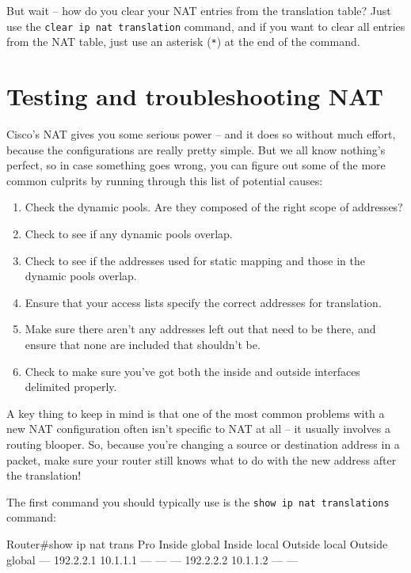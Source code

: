 But wait -- how do you clear your NAT entries from the translation table?
Just use the \texttt{clear\ ip\ nat\ translation} command, and if you
want to clear all entries from the NAT table, just use an asterisk
(\texttt{*}) at the end of the command.



\section{Testing and troubleshooting NAT}

Cisco's NAT gives you some serious power -- and it does so without much
effort, because the configurations are really pretty simple. But we all
know nothing's perfect, so in case something goes wrong, you can figure
out some of the more common culprits by running through this list of
potential causes:

\begin{enumerate}
\item
  Check the dynamic pools. Are they composed of the right scope of
  addresses?
\item
  Check to see if any dynamic pools overlap.
\item
  Check to see if the addresses used for static mapping and those in the
  dynamic pools overlap.
\item
  Ensure that your
  access lists specify the correct addresses for translation.
\item
  Make sure there aren't any addresses left out that need to be there,
  and ensure that none are included that shouldn't be.
\item
  Check to make sure you've got both the inside and outside interfaces
  delimited properly.
\end{enumerate}

A key thing to keep in mind is that one of the most common problems with
a new NAT configuration often isn't specific to NAT at all -- it usually
involves a routing blooper. So, because you're changing a source or
destination address in a packet, make sure your router still knows what
to do with the new address after the translation!

The first command you should typically use is the
\texttt{show\ ip\ nat\ translations} command:

\begin{cli}
Router#show ip nat trans
Pro   Inside global   Inside local   Outside local   Outside global
---   192.2.2.1       10.1.1.1       ---             ---
---   192.2.2.2       10.1.1.2       ---             ---
\end{cli}

